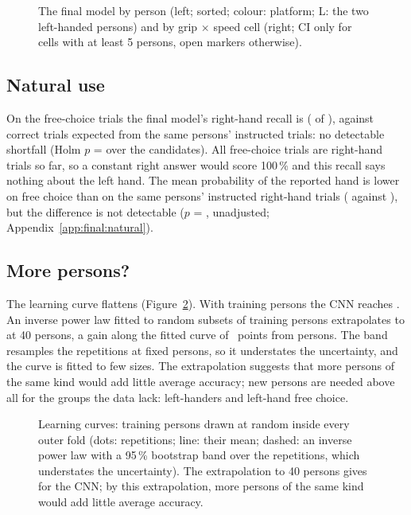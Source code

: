 \begin{figure}[htbp]
\centering
{}
\caption{The final model by person (left; sorted; colour: platform; L: the two left-handed persons) and by grip
$\times$ speed cell (right; CI only for cells with at least 5 persons, open markers otherwise).}
\label{fig:FINAL_11_persons}
\end{figure}

\subsection{Natural use}\label{sec:results:natural}
On the free-choice trials the final model's right-hand recall is 
( of ), against  correct trials expected
from the same persons' instructed trials: no detectable shortfall (Holm $p$ =  over the
 candidates). All free-choice
trials are right-hand trials so far, so a constant right answer would score 100\,\% and this recall says nothing
about the left hand. The mean probability of the reported hand is lower on free choice than on the same
persons' instructed right-hand trials ( against ), but the
difference is not detectable ($p$ = , unadjusted; Appendix~\ref{app:final:natural}).

\subsection{More persons?}\label{sec:results:learning}
The learning curve flattens (Figure~\ref{fig:FINAL_12_learning_curve}). With  training
persons the CNN reaches . An inverse power law fitted to random subsets of training
persons extrapolates to  at 40 persons, a gain along the fitted curve of
~points from  persons. The band resamples the repetitions at
fixed persons, so it understates the uncertainty, and the curve is fitted to few sizes. The extrapolation suggests
that more persons of the same kind would add little average accuracy; new persons are needed above all for the
groups the data lack: left-handers and left-hand free choice.

\begin{figure}[htbp]
\centering
{}
\caption{Learning curves: training persons drawn at random inside every outer fold (dots: repetitions; line: their
mean; dashed: an inverse power law with a 95\,\% bootstrap band over the repetitions, which understates the
uncertainty). The extrapolation to 40 persons gives  for the CNN; by this extrapolation,
more persons of the same kind would add little average accuracy.}
\label{fig:FINAL_12_learning_curve}
\end{figure}
